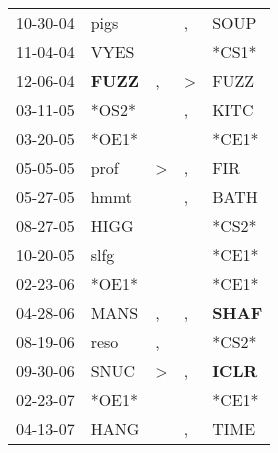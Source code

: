 \begin{supertabular}{p{0.07\textwidth}p{0.06\textwidth}p{0.02\textwidth}p{0.02\textwidth}p{0.06\textwidth}}
 10-30-04\textsuperscript{} &           pigs\textsuperscript{} &               &             , &           SOUP\textsuperscript{} \\
 11-04-04\textsuperscript{} &           VYES\textsuperscript{} &               &               &                            *CS1* \\
 12-06-04\textsuperscript{} &  \textbf{FUZZ\textsuperscript{}} &             , &  \textgreater &           FUZZ\textsuperscript{} \\
 03-11-05\textsuperscript{} &                            *OS2* &               &             , &           KITC\textsuperscript{} \\
 03-20-05\textsuperscript{} &                            *OE1* &               &               &                            *CE1* \\
 05-05-05\textsuperscript{} &           prof\textsuperscript{} &  \textgreater &             , &            FIR\textsuperscript{} \\
 05-27-05\textsuperscript{} &           hmmt\textsuperscript{} &               &             , &           BATH\textsuperscript{} \\
 08-27-05\textsuperscript{} &           HIGG\textsuperscript{} &               &               &                            *CS2* \\
 10-20-05\textsuperscript{} &           slfg\textsuperscript{} &               &               &                            *CE1* \\
 02-23-06\textsuperscript{} &                            *OE1* &               &               &                            *CE1* \\
 04-28-06\textsuperscript{} &           MANS\textsuperscript{} &             , &             , &  \textbf{SHAF\textsuperscript{}} \\
 08-19-06\textsuperscript{} &           reso\textsuperscript{} &             , &               &                            *CS2* \\
 09-30-06\textsuperscript{} &           SNUC\textsuperscript{} &  \textgreater &             , &  \textbf{ICLR\textsuperscript{}} \\
 02-23-07\textsuperscript{} &                            *OE1* &               &               &                            *CE1* \\
 04-13-07\textsuperscript{} &           HANG\textsuperscript{} &               &             , &           TIME\textsuperscript{} \\

\end{supertabular}
